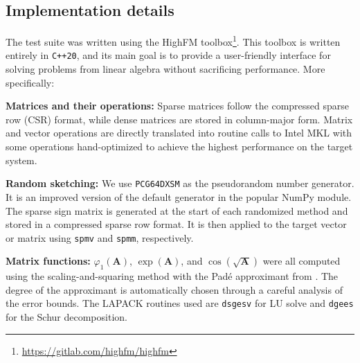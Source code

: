 \documentclass[smallextended]{svjour3}
\newcommand{\mat}[1]{\mathbf{#1}}
\begin{document}
\begin{appendix}
\section{Implementation details}
\label{appendix:implementation}
\setcounter{equation}{0}
\renewcommand{\theequation}{A.\arabic{equation}}

The test suite was written using the HighFM toolbox\footnote{\url{https://gitlab.com/highfm/highfm}}. This toolbox is written entirely in \texttt{C++20}, and its main goal is to provide a user-friendly interface for solving problems from linear algebra without sacrificing performance. More specifically:

\textbf{Matrices and their operations:} Sparse matrices follow the compressed sparse row (CSR) format, while dense matrices are stored in column-major form. Matrix and vector operations are directly translated into routine calls to Intel MKL with some operations hand-optimized to achieve the highest performance on the target system.

\textbf{Random sketching:} We use \texttt{PCG64DXSM} \cite{oneill_pcg_2014} as the pseudorandom number generator. It is an improved version of the default generator in the popular NumPy \cite{numpy} module. The sparse sign matrix is generated at the start of each randomized method and stored in a compressed sparse row format. It is then applied to the target vector or matrix using \texttt{spmv} and \texttt{spmm}, respectively.

\textbf{Matrix functions:} $\varphi_1(\mat{A})$, $\exp(\mat{A})$, and $\cos(\sqrt{\mat{A}})$ were all computed using the scaling-and-squaring method with the Padé approximant from \cite{higham_scaling_2005,al-mohy_new_2015}. The degree of the approximant is automatically chosen through a careful analysis of the error bounds. The LAPACK routines used are \texttt{dsgesv} for LU solve and \texttt{dgees} for the Schur decomposition.


\end{appendix}
\end{document}

